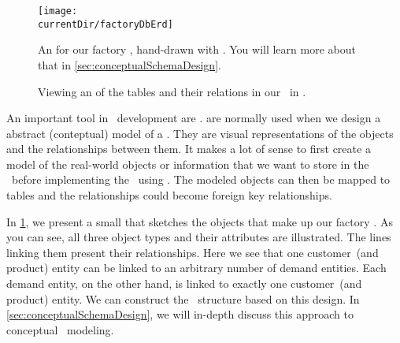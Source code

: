 %
%
\FloatBarrier%
%
\begin{figure}%
\centering%
\texttt{[image: \\currentDir/factoryDbErd]}%
\caption{An  for our factory , hand-drawn with \yEd. %
You will learn more about that in \cref{sec:conceptualSchemaDesign}.}%
\label{fig:factoryDbErd}%
\end{figure}%
%
\begin{figure}%
\centering%
%
%
%
\floatSep%
%
%
%
\floatRowSep%
%
%
%
%
\caption{Viewing an  of the tables and their relations in our \db\ in \libreofficeBase.}%
\label{fig:factoryLibreOfficeBaseERD}%
%
\end{figure}%
%
An important tool in \db\ development are .
 are normally used when we design a abstract (conteptual) model of a \db.
They are visual representations of the objects and the relationships between them.
It makes a lot of sense to first create a model of the real-world objects or information that we want to store in the \db\ before implementing the \db\ using \sql.
The modeled objects can then be mapped to tables and the relationships could become foreign key relationships.

In \cref{fig:factoryDbErd}, we present a small  that sketches the objects that make up our factory \db.
As you can see, all three object types and their attributes are illustrated.
The lines linking them present their relationships.
Here we see that one customer~(and product) entity can be linked to an arbitrary number of demand entities.
Each demand entity, on the other hand, is linked to exactly one customer~(and product) entity.
We can construct the \db\ structure based on this design.
In \cref{sec:conceptualSchemaDesign}, we will in-depth discuss this approach to conceptual \db\ modeling.

